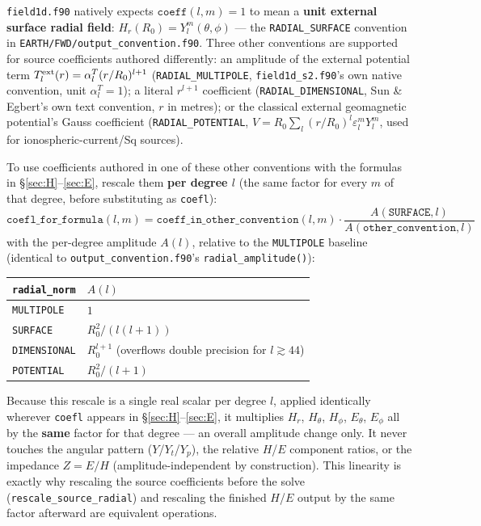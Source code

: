 \documentclass[11pt]{article}
\begin{document}
\texttt{field1d.f90} natively expects $\mathtt{coeff}(l,m)=1$ to mean a \textbf{unit external
surface radial field}: $H_r(R_0) = Y_l^m(\theta,\phi)$ --- the \texttt{RADIAL\_SURFACE} convention
in \texttt{EARTH/FWD/output\_convention.f90}. Three other conventions are supported for source
coefficients authored differently: an amplitude of the external potential term
$T_l^{\rm ext}(r)=\alpha_l^T(r/R_0)^{l+1}$ (\texttt{RADIAL\_MULTIPOLE}, \texttt{field1d\_s2.f90}'s
own native convention, unit $\alpha_l^T=1$); a literal $r^{l+1}$ coefficient
(\texttt{RADIAL\_DIMENSIONAL}, Sun \& Egbert's own text convention, $r$ in metres); or the
classical external geomagnetic potential's Gauss coefficient (\texttt{RADIAL\_POTENTIAL},
$V=R_0\sum_l(r/R_0)^l\varepsilon_l^m Y_l^m$, used for ionospheric-current/Sq sources).

To use coefficients authored in one of these other conventions with the formulas in
\S\ref{sec:H}--\ref{sec:E}, rescale them \textbf{per degree $l$} (the same factor for every $m$
of that degree, before substituting as \texttt{coefl}):
\begin{equation}
\mathtt{coefl\_for\_formula}(l,m) = \mathtt{coeff\_in\_other\_convention}(l,m)\cdot
\frac{A(\mathtt{SURFACE},l)}{A(\mathtt{other\_convention},l)}
\end{equation}
with the per-degree amplitude $A(l)$, relative to the \texttt{MULTIPOLE} baseline (identical to
\texttt{output\_convention.f90}'s \texttt{radial\_amplitude()}):

\begin{table}[h]
\centering
\begin{tabular}{ll}
\toprule
\texttt{radial\_norm} & $A(l)$ \\
\midrule
\texttt{MULTIPOLE}   & $1$ \\
\texttt{SURFACE}     & $R_0^2/(l(l{+}1))$ \\
\texttt{DIMENSIONAL} & $R_0^{l+1}$ (overflows double precision for $l\gtrsim44$) \\
\texttt{POTENTIAL}   & $R_0^2/(l{+}1)$ \\
\bottomrule
\end{tabular}
\end{table}

Because this rescale is a single real scalar per degree $l$, applied identically wherever
\texttt{coefl} appears in \S\ref{sec:H}--\ref{sec:E}, it multiplies $H_r$, $H_\theta$, $H_\phi$,
$E_\theta$, $E_\phi$ all by the \textbf{same} factor for that degree --- an overall amplitude
change only. It never touches the angular pattern ($Y$/$Y_t$/$Y_p$), the relative $H$/$E$
component ratios, or the impedance $Z=E/H$ (amplitude-independent by construction). This
linearity is exactly why rescaling the source coefficients before the solve
(\texttt{rescale\_source\_radial}) and rescaling the finished $H$/$E$ output by the same factor
afterward are equivalent operations.
\end{document}
